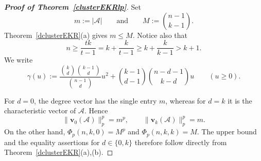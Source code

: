 \documentclass[10pt,a4paper]{amsart}
\numberwithin{equation}{section}
\def\A{\mathcal{A}}
\def\v{\mathbf{v}}
\begin{document}
\begin{proof}[{\bf Proof of Theorem~\ref{clusterEKRlp}}]
Set
	\[
	m:=|\A|
	\qquad\text{and}\qquad
	M:=\binom{n-1}{k-1}.
	\]
	Theorem~\ref{dclusterEKR}(a) gives $m\leq M$.
Notice also that
	\[
	n\geq \frac{tk}{t-1}=k+\frac{k}{t-1}
	\geq k+\frac{k}{k-1}>k+1.
	\]
We write
\[
\gamma(u):=
	\frac{\binom kd\binom{k-1}d}{\binom{n-1}d}u^2
	+\binom{k-1}{d-1}\binom{n-d-1}{k-d}u
	\qquad (u\geq0).
\]


	

For $d=0$, the degree vector has the single entry $m$,
whereas for $d=k$ it is the characteristic vector of $\A$.
Hence
	\[
	\|\v_0(\A)\|_p^p=m^p,
	\qquad
	\|\v_k(\A)\|_p^p=m.
	\]
On the other hand,
	$\Phi_p(n,k,0)=M^p$ and $\Phi_p(n,k,k)=M$.
The upper bound and the equality assertions for $d\in\{0,k\}$ therefore follow directly from Theorem~\ref{dclusterEKR}(a),(b).
	






\end{proof}
\end{document}
